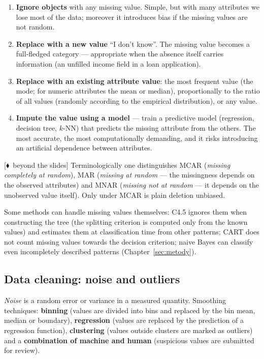 \documentclass[11pt,a4paper]{article}
\theoremstyle{definition}
\providecommand{\uv}[1]{``#1''}
\newcommand{\mimo}{\textcolor{markcol}{\textsf{\footnotesize[$\blacklozenge$~beyond the slides]}}}
\begin{document}
\begin{enumerate}
\item \textbf{Ignore objects} with any missing value. Simple, but with many attributes we lose
      most of the data; moreover it introduces bias if the missing values are not random.
\item \textbf{Replace with a new value} \uv{I don't know}. The missing value becomes a
      full-fledged category --- appropriate when the absence itself carries information (an
      unfilled income field in a loan application).
\item \textbf{Replace with an existing attribute value}: the most frequent value (the mode; for
      numeric attributes the mean or median), proportionally to the ratio of all values
      (randomly according to the empirical distribution), or any value.
\item \textbf{Impute the value using a model} --- train a predictive model (regression, decision
      tree, $k$-NN) that predicts the missing attribute from the others. The most accurate, the
      most computationally demanding, and it risks introducing an artificial dependence between
      attributes.
\end{enumerate}

\mimo{} Terminologically one distinguishes MCAR (\emph{missing completely at random}), MAR
(\emph{missing at random} --- the missingness depends on the observed attributes) and MNAR
(\emph{missing not at random} --- it depends on the unobserved value itself). Only under MCAR is
plain deletion unbiased.

Some methods can handle missing values themselves: C4.5 ignores them when constructing the tree
(the splitting criterion is computed only from the known values) and estimates them at
classification time from other patterns; CART does not count missing values towards the decision
criterion; naive Bayes can classify even incompletely described patterns
(Chapter~\ref{sec:metody}).

\subsection{Data cleaning: noise and outliers}

\emph{Noise} is a random error or variance in a measured quantity. Smoothing techniques:
\textbf{binning} (values are divided into bins and replaced by the bin mean, median or boundary),
\textbf{regression} (values are replaced by the prediction of a regression function),
\textbf{clustering} (values outside clusters are marked as outliers) and a \textbf{combination
of machine and human} (suspicious values are submitted for review).
\end{document}
